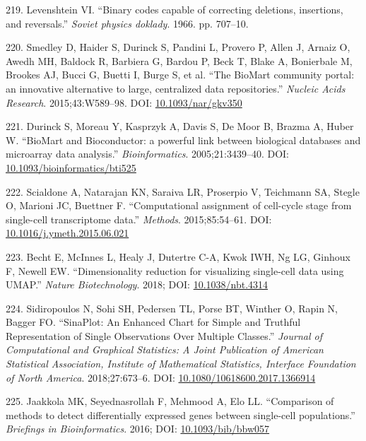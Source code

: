\documentclass[11pt,a4paper,titlepage,twoside,openright]{style/unimelbthesis}
\theoremstyle{definition}
\theoremstyle{definition}
\theoremstyle{definition}
\theoremstyle{remark}
\begin{document}
\begin{mainmatter}
\leavevmode\hypertarget{ref-Levenshtein1966-fq}{}%
219. Levenshtein VI. ``Binary codes capable of correcting deletions, insertions, and reversals.'' \emph{Soviet physics doklady}. 1966. pp. 707--10.

\leavevmode\hypertarget{ref-Smedley2015-an}{}%
220. Smedley D, Haider S, Durinck S, Pandini L, Provero P, Allen J, Arnaiz O, Awedh MH, Baldock R, Barbiera G, Bardou P, Beck T, Blake A, Bonierbale M, Brookes AJ, Bucci G, Buetti I, Burge S, et al. ``The BioMart community portal: an innovative alternative to large, centralized data repositories.'' \emph{Nucleic Acids Research}. 2015;43:W589--98. DOI: \href{https://doi.org/10.1093/nar/gkv350}{10.1093/nar/gkv350}

\leavevmode\hypertarget{ref-Durinck2005-zb}{}%
221. Durinck S, Moreau Y, Kasprzyk A, Davis S, De Moor B, Brazma A, Huber W. ``BioMart and Bioconductor: a powerful link between biological databases and microarray data analysis.'' \emph{Bioinformatics}. 2005;21:3439--40. DOI: \href{https://doi.org/10.1093/bioinformatics/bti525}{10.1093/bioinformatics/bti525}

\leavevmode\hypertarget{ref-Scialdone2015-rp}{}%
222. Scialdone A, Natarajan KN, Saraiva LR, Proserpio V, Teichmann SA, Stegle O, Marioni JC, Buettner F. ``Computational assignment of cell-cycle stage from single-cell transcriptome data.'' \emph{Methods}. 2015;85:54--61. DOI: \href{https://doi.org/10.1016/j.ymeth.2015.06.021}{10.1016/j.ymeth.2015.06.021}

\leavevmode\hypertarget{ref-Becht2018-zh}{}%
223. Becht E, McInnes L, Healy J, Dutertre C-A, Kwok IWH, Ng LG, Ginhoux F, Newell EW. ``Dimensionality reduction for visualizing single-cell data using UMAP.'' \emph{Nature Biotechnology}. 2018; DOI: \href{https://doi.org/10.1038/nbt.4314}{10.1038/nbt.4314}

\leavevmode\hypertarget{ref-Sidiropoulos2018-ll}{}%
224. Sidiropoulos N, Sohi SH, Pedersen TL, Porse BT, Winther O, Rapin N, Bagger FO. ``SinaPlot: An Enhanced Chart for Simple and Truthful Representation of Single Observations Over Multiple Classes.'' \emph{Journal of Computational and Graphical Statistics: A Joint Publication of American Statistical Association, Institute of Mathematical Statistics, Interface Foundation of North America}. 2018;27:673--6. DOI: \href{https://doi.org/10.1080/10618600.2017.1366914}{10.1080/10618600.2017.1366914}

\leavevmode\hypertarget{ref-Jaakkola2016-ko}{}%
225. Jaakkola MK, Seyednasrollah F, Mehmood A, Elo LL. ``Comparison of methods to detect differentially expressed genes between single-cell populations.'' \emph{Briefings in Bioinformatics}. 2016; DOI: \href{https://doi.org/10.1093/bib/bbw057}{10.1093/bib/bbw057}


\end{mainmatter}
\end{document}
